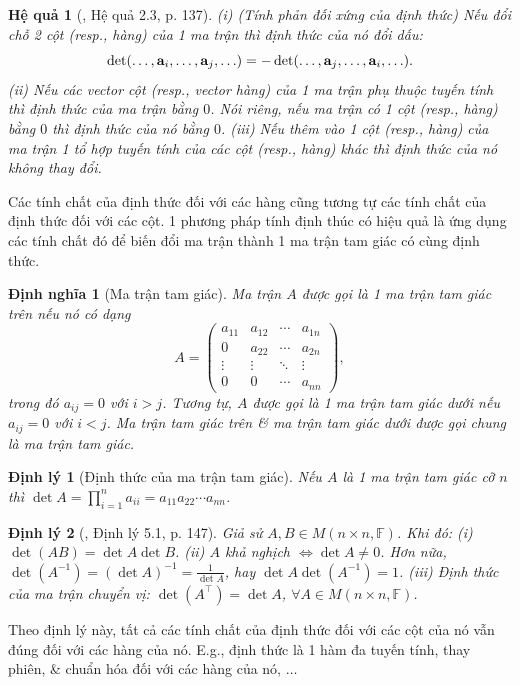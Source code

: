 \documentclass{article}
\newtheorem{dinhly}{Định lý}
\newtheorem{dinhnghia}{Định nghĩa}
\newtheorem{hequa}{Hệ quả}
\begin{document}
\begin{hequa}[\cite{Hung_linear_algebra}, Hệ quả 2.3, p. 137]
	(i) {\rm(Tính phản đối xứng của định thức)} Nếu đổi chỗ 2 cột (resp., hàng) của 1 ma trận thì định thức của nó đổi dấu:
	\begin{equation*}
		\det(\ldots,{\bf a}_i,\ldots,{\bf a}_j,\ldots) = -\det(\ldots,{\bf a}_j,\ldots,{\bf a}_i,\ldots).
	\end{equation*}
	(ii) Nếu các vector cột (resp., vector hàng) của 1 ma trận phụ thuộc tuyến tính thì định thức của ma trận bằng $0$. Nói riêng, nếu ma trận có 1 cột (resp., hàng) bằng $0$ thì định thức của nó bằng $0$. (iii) Nếu thêm vào 1 cột (resp., hàng) của ma trận 1 tổ hợp tuyến tính của các cột (resp., hàng) khác thì định thức của nó không thay đổi.
\end{hequa}
Các tính chất của định thức đối với các hàng cũng tương tự các tính chất của định thức đối với các cột. 1 phương pháp tính định thúc có hiệu quả là ứng dụng các tính chất đó để biến đổi ma trận thành 1 ma trận tam giác có cùng định thức.

\begin{dinhnghia}[Ma trận tam giác]
	Ma trận $A$ được gọi là 1 {\rm ma trận tam giác trên} nếu nó có dạng
	\begin{equation*}
		A = \begin{pmatrix}
			a_{11} & a_{12} & \cdots & a_{1n}\\0 & a_{22} & \cdots & a_{2n}\\
			\vdots & \vdots & \ddots & \vdots\\0 & 0 & \cdots & a_{nn}
		\end{pmatrix},
	\end{equation*}
	trong đó $a_{ij} = 0$ với $i > j$. Tương tự, $A$ được gọi là 1 {\rm ma trận tam giác dưới} nếu $a_{ij} = 0$ với $i < j$. Ma trận tam giác trên \& ma trận tam giác dưới được gọi chung là {\rm ma trận tam giác}.
\end{dinhnghia}

\begin{dinhly}[Định thức của ma trận tam giác]
	Nếu $A$ là 1 ma trận tam giác cỡ $n$ thì $\det A = \prod_{i=1}^n a_{ii} = a_{11}a_{22}\cdots a_{nn}$.
\end{dinhly}

\begin{dinhly}[\cite{Hung_linear_algebra}, Định lý 5.1, p. 147]
	Giả sử $A,B\in M(n\times n,\mathbb{F})$. Khi đó: (i) $\det(AB) = \det A\det B$. (ii) $A$ khả nghịch $\Leftrightarrow\det A\ne0$. Hơn nữa, $\det(A^{-1}) = (\det A)^{-1} = \frac{1}{\det A}$, hay $\det A\det(A^{-1}) = 1$. (iii) Định thức của ma trận chuyển vị: $\det(A^\top) = \det A$, $\forall A\in M(n\times n,\mathbb{F})$.
\end{dinhly}
Theo định lý này, tất cả các tính chất của định thức đối với các cột của nó vẫn đúng đối với các hàng của nó. E.g., định thức là 1 hàm đa tuyến tính, thay phiên, \& chuẩn hóa đối với các hàng của nó, $\ldots$
\end{document}

